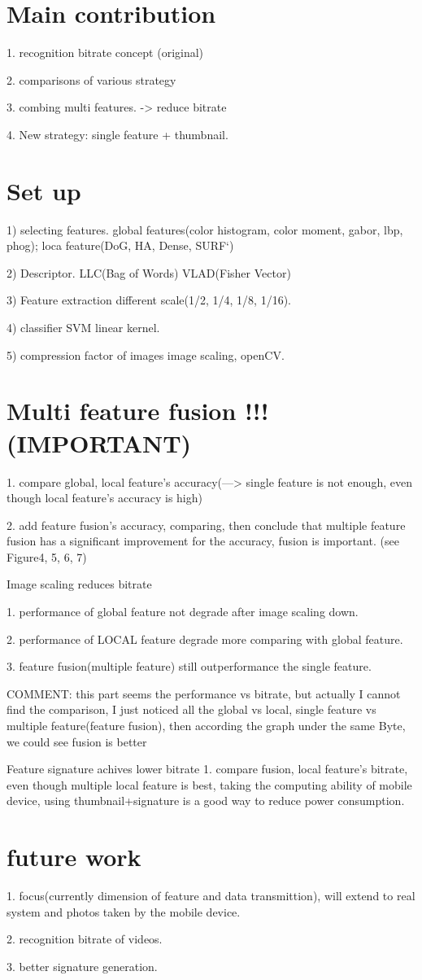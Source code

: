 \documentclass[12pt]{article}
\begin{document}
\section{Main contribution}
    1. recognition bitrate concept (original)
    
    2. comparisons of various strategy
    
    3. combing multi features. -> reduce bitrate
    
    4. New strategy: single feature + thumbnail.


\section{Set up}
1) selecting features.
    global features(color histogram, color moment, gabor, lbp, phog);
    loca feature(DoG, HA, Dense, SURF`)

2) Descriptor.
    LLC(Bag of Words)
    VLAD(Fisher Vector)

3) Feature extraction
    different scale(1/2, 1/4, 1/8, 1/16).

4) classifier
    SVM linear kernel.

5) compression factor of images
    image scaling, openCV.

\section{Multi feature fusion !!!(IMPORTANT)}
1. compare global, local feature's accuracy(---> single feature is not enough, even though local feature's accuracy is high)

2. add feature fusion's accuracy, comparing, then conclude that multiple feature fusion has a significant improvement for the accuracy, fusion is important.
(see Figure4, 5, 6, 7)

Image scaling reduces bitrate

1. performance of global feature not degrade after image scaling down.

2. performance of LOCAL feature degrade more comparing with global feature.

3. feature fusion(multiple feature) still outperformance the single feature.

COMMENT:
this part seems the performance vs bitrate, but actually I cannot find the comparison, I just noticed all the global vs local, single feature vs multiple feature(feature fusion), then according the graph under the same Byte, we could see fusion is better


Feature signature achives lower bitrate
    1. compare fusion, local feature's bitrate, even though multiple local feature is best, taking the computing ability of mobile device, using thumbnail+signature is a good way to reduce power consumption.


\section{future work}
1. focus(currently dimension of feature and data transmittion), will extend to real system and photos taken by the mobile device.

2. recognition bitrate of videos.

3. better signature generation.
\end{document}
